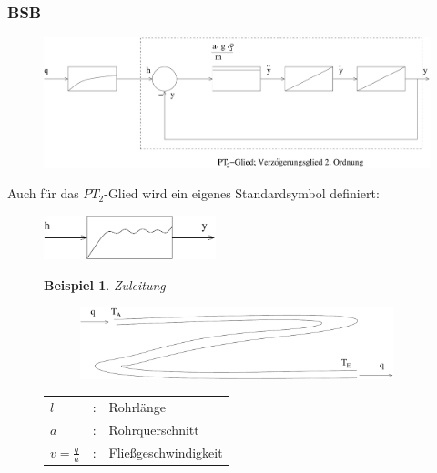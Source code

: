 \message{ !name(Mitschrieb_SysRegel.tex)}\documentclass[12pt,a4paper,ngerman]{scrartcl}
\newtheorem{bsp}{Beispiel}[section] %
\begin{document}
\subsubsection*{BSB}

\begin{figure}[H]
  \centering
\includegraphics[width=.8\linewidth]{sysregel_bsb5}  
\end{figure}

Auch für das $PT_2$-Glied wird ein eigenes Standardsymbol definiert:
\begin{figure}[H]
\includegraphics[width=5cm]{sysregel_pt2}
  
\end{figure}

\begin{figure}[H]
\begin{bsp}
Zuleitung
\end{bsp}

\begin{minipage}{.6\linewidth}
\begin{figure}[H]
 \includegraphics[width=.9\linewidth]{sysregel_bsp_5} 
\end{figure}
\end{minipage}
\begin{minipage}{.4\linewidth}
\begin{tabular}{lll}
$l$&:& Rohrlänge\\
$a$&:&Rohrquerschnitt\\
$v=\frac{q}{a}$&:& Fließgeschwindigkeit
\end{tabular}
\end{minipage}
\end{figure}
\end{document}
